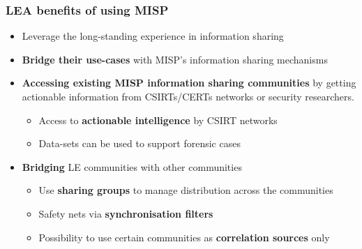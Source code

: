 \begin{frame}
\frametitle{LEA benefits of using MISP}
\begin{itemize}
        \item  Leverage the long-standing experience in information sharing
        \item  {\bf Bridge their use-cases} with MISP's information sharing mechanisms
        \item {\bf Accessing existing MISP information sharing communities} by getting actionable information from CSIRTs/CERTs networks or security researchers.
        \begin{itemize}
            \item Access to {\bf actionable intelligence} by CSIRT networks
            \item Data-sets can be used to support forensic cases
        \end{itemize}
        \item {\bf Bridging} LE communities with other communities
        \begin{itemize}
            \item Use {\bf sharing groups} to manage distribution across the communities
            \item Safety nets via {\bf synchronisation filters}
            \item Possibility to use certain communities as {\bf correlation sources} only
        \end{itemize}
\end{itemize}
\end{frame}

